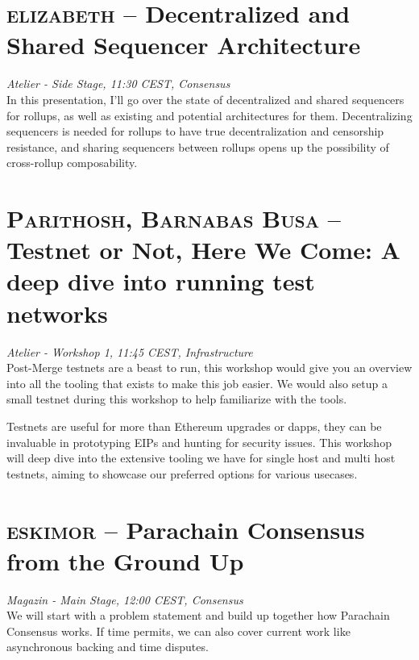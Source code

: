 \section {\textsc{elizabeth} -- Decentralized and Shared Sequencer Architecture
} \noindent \textit {Atelier - Side Stage, 11:30 CEST, Consensus
}\\[1em] In this presentation, I'll go over the state of decentralized and shared sequencers for rollups, as well as existing and potential architectures for them. Decentralizing sequencers is needed for rollups to have true decentralization and censorship resistance, and sharing sequencers between rollups opens up the possibility of cross-rollup composability.
\clearpage
\section {\textsc{Parithosh, Barnabas Busa} -- Testnet or Not, Here We Come: A deep dive into running test networks
} \noindent \textit {Atelier - Workshop 1, 11:45 CEST, Infrastructure
}\\[1em] Post-Merge testnets are a beast to run, this workshop would give you an overview into all the tooling that exists to make this job easier. We would also setup a small testnet during this workshop to help familiarize with the tools.
\par Testnets are useful for more than Ethereum upgrades or dapps, they can be invaluable in prototyping EIPs and hunting for security issues. This workshop will deep dive into the extensive tooling we have for single host and multi host testnets, aiming to showcase our preferred options for various usecases.
\clearpage
\section {\textsc{eskimor} -- Parachain Consensus from the Ground Up
} \noindent \textit {Magazin - Main Stage, 12:00 CEST, Consensus
}\\[1em] We will start with a problem statement and build up together how Parachain Consensus works. If time permits, we can also cover current work like asynchronous backing and time disputes.
\par \clearpage
